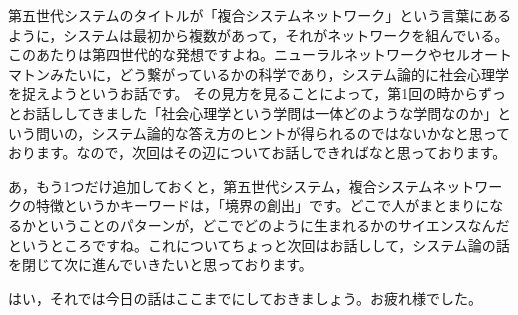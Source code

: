 \documentclass{ltjsbook}
\begin{document}
第五世代システムのタイトルが「複合システムネットワーク」という言葉にあるように，システムは最初から複数があって，それがネットワークを組んでいる。このあたりは第四世代的な発想ですよね。ニューラルネットワークやセルオートマトンみたいに，どう繋がっているかの科学であり，システム論的に社会心理学を捉えようというお話です。
その見方を見ることによって，第1回の時からずっとお話ししてきました「社会心理学という学問は一体どのような学問なのか」という問いの，システム論的な答え方のヒントが得られるのではないかなと思っております。なので，次回はその辺についてお話しできればなと思っております。

あ，もう1つだけ追加しておくと，第五世代システム，複合システムネットワークの特徴というかキーワードは，「境界の創出」です。どこで人がまとまりになるかということのパターンが，どこでどのように生まれるかのサイエンスなんだというところですね。これについてちょっと次回はお話しして，システム論の話を閉じて次に進んでいきたいと思っております。

はい，それでは今日の話はここまでにしておきましょう。お疲れ様でした。
\end{document}
